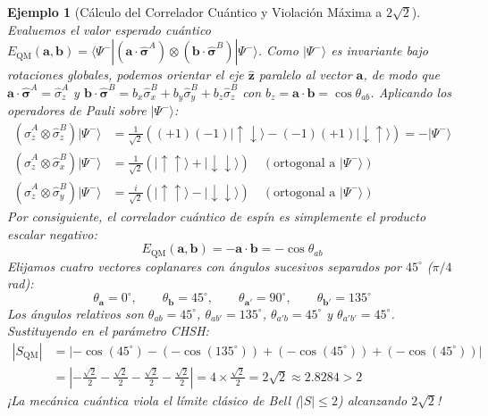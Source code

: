 \documentclass[11pt,a4paper]{book}
\newtheorem{ejemplo}{Ejemplo}[chapter]
\begin{document}
\begin{ejemplo}[Cálculo del Correlador Cuántico y Violación Máxima a $2\sqrt{2}$]
Evaluemos el valor esperado cuántico $E_{\text{QM}}(\mathbf{a}, \mathbf{b}) = \langle \Psi^- | (\mathbf{a}\cdot\hat{\bm{\sigma}}^A) \otimes (\mathbf{b}\cdot\hat{\bm{\sigma}}^B) | \Psi^- \rangle$. Como $|\Psi^-\rangle$ es invariante bajo rotaciones globales, podemos orientar el eje $\hat{\mathbf{z}}$ paralelo al vector $\mathbf{a}$, de modo que $\mathbf{a}\cdot\hat{\bm{\sigma}}^A = \hat{\sigma}_z^A$ y $\mathbf{b}\cdot\hat{\bm{\sigma}}^B = b_x \hat{\sigma}_x^B + b_y \hat{\sigma}_y^B + b_z \hat{\sigma}_z^B$ con $b_z = \mathbf{a}\cdot\mathbf{b} = \cos\theta_{ab}$. Aplicando los operadores de Pauli sobre $|\Psi^-\rangle$:
\begin{align}
(\hat{\sigma}_z^A \otimes \hat{\sigma}_z^B) |\Psi^-\rangle &= \frac{1}{\sqrt{2}} \left( (+1)(-1)|\uparrow\downarrow\rangle - (-1)(+1)|\downarrow\uparrow\rangle \right) = -|\Psi^-\rangle \\
(\hat{\sigma}_z^A \otimes \hat{\sigma}_x^B) |\Psi^-\rangle &= \frac{1}{\sqrt{2}} \left( |\uparrow\uparrow\rangle + |\downarrow\downarrow\rangle \right) \quad (\text{ortogonal a } |\Psi^-\rangle) \\
(\hat{\sigma}_z^A \otimes \hat{\sigma}_y^B) |\Psi^-\rangle &= \frac{i}{\sqrt{2}} \left( |\uparrow\uparrow\rangle - |\downarrow\downarrow\rangle \right) \quad (\text{ortogonal a } |\Psi^-\rangle)
\end{align}
Por consiguiente, el correlador cuántico de espín es simplemente el producto escalar negativo:
\begin{equation}
E_{\text{QM}}(\mathbf{a}, \mathbf{b}) = -\mathbf{a} \cdot \mathbf{b} = -\cos\theta_{ab}
\end{equation}
Elijamos cuatro vectores coplanares con ángulos sucesivos separados por $45^\circ$ ($\pi/4$ rad):
\begin{equation}
\theta_{\mathbf{a}} = 0^\circ, \qquad \theta_{\mathbf{b}} = 45^\circ, \qquad \theta_{\mathbf{a}'} = 90^\circ, \qquad \theta_{\mathbf{b}'} = 135^\circ
\end{equation}
Los ángulos relativos son $\theta_{ab} = 45^\circ$, $\theta_{ab'} = 135^\circ$, $\theta_{a'b} = 45^\circ$ y $\theta_{a'b'} = 45^\circ$. Sustituyendo en el parámetro CHSH:
\begin{align}
|S_{\text{QM}}| &= \left| -\cos(45^\circ) - \left(-\cos(135^\circ)\right) + \left(-\cos(45^\circ)\right) + \left(-\cos(45^\circ)\right) \right| \\
&= \left| -\frac{\sqrt{2}}{2} - \frac{\sqrt{2}}{2} - \frac{\sqrt{2}}{2} - \frac{\sqrt{2}}{2} \right| = 4 \times \frac{\sqrt{2}}{2} = 2\sqrt{2} \approx 2.8284 > 2
\end{align}
¡La mecánica cuántica viola el límite clásico de Bell ($|S| \leq 2$) alcanzando $2\sqrt{2}$!
\end{ejemplo}
\end{document}
